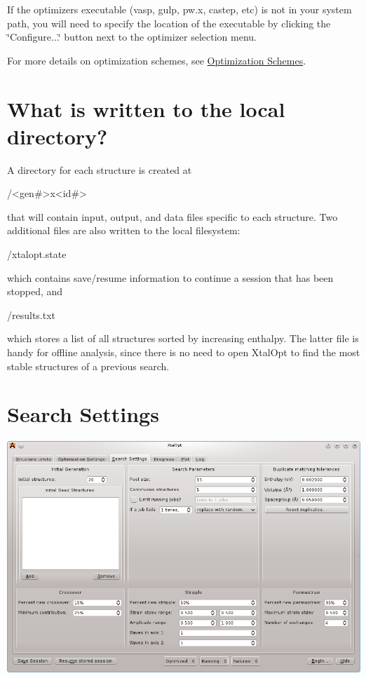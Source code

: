 If the optimizer\textquotesingle{}s executable (vasp, gulp, pw.\+x, castep, etc) is not in your system path, you will need to specify the location of the executable by clicking the \char`\"{}\+Configure...\char`\"{} button next to the optimizer selection menu.

For more details on optimization schemes, see \hyperlink{optschemes}{Optimization Schemes}.\hypertarget{tut-xo_files}{}\section{What is written to the local directory?}\label{tut-xo_files}
A directory for each structure is created at


\begin{DoxyCode}
/<gen#>x<id#>
\end{DoxyCode}


that will contain input, output, and data files specific to each structure. Two additional files are also written to the local filesystem\+:


\begin{DoxyCode}
/xtalopt.state
\end{DoxyCode}


which contains save/resume information to continue a session that has been stopped, and


\begin{DoxyCode}
/results.txt
\end{DoxyCode}


which stores a list of all structures sorted by increasing enthalpy. The latter file is handy for offline analysis, since there is no need to open Xtal\+Opt to find the most stable structures of a previous search.\hypertarget{tut-xo_search-set}{}\section{Search Settings}\label{tut-xo_search-set}
 
\begin{DoxyImageNoCaption}
  \mbox{\includegraphics[width=\textwidth]{search-set.png}}
\end{DoxyImageNoCaption}


